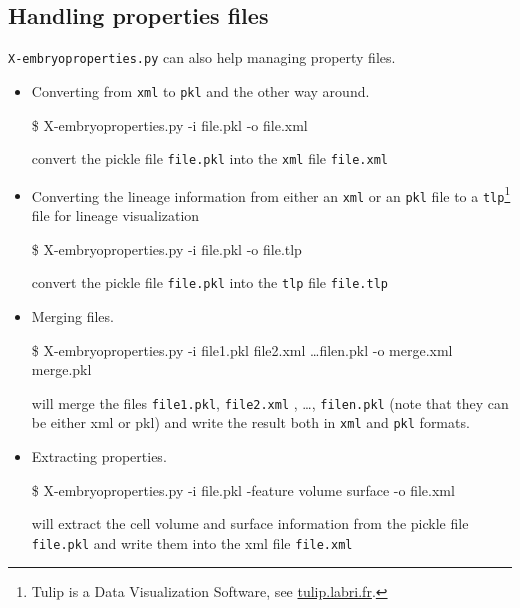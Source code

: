\subsection{Handling properties files}

\texttt{X-embryoproperties.py} can also help managing property files.

\begin{itemize}
  \itemsep -0.5ex
\item Converting from \texttt{xml} to \texttt{pkl} and  the other way around.
  \begin{code}{0.8}
  \$ X-embryoproperties.py -i file.pkl -o file.xml
  \end{code}
  convert the pickle file \texttt{file.pkl} into the \texttt{xml} file  \texttt{file.xml}
\item Converting the lineage information from either an \texttt{xml}
  or an \texttt{pkl} file to a \texttt{tlp}\footnote{Tulip is a Data
    Visualization Software, see \url{tulip.labri.fr}.} file for lineage visualization
  \begin{code}{0.8}
  \$ X-embryoproperties.py -i file.pkl -o file.tlp
  \end{code}
  convert the pickle file \texttt{file.pkl} into the \texttt{tlp} file  \texttt{file.tlp}
\item Merging files.
  \begin{code}{0.8}
  \$ X-embryoproperties.py -i file1.pkl file2.xml \ldots filen.pkl -o merge.xml merge.pkl
  \end{code}
  will merge the files  \texttt{file1.pkl},  \texttt{file2.xml} , \ldots, \texttt{filen.pkl} (note that they can be either xml or pkl) and write the result both in \texttt{xml} and \texttt{pkl} formats.
\item Extracting properties.
  \begin{code}{0.8}
  \$ X-embryoproperties.py -i file.pkl -feature volume surface -o file.xml
  \end{code}
  will extract the cell volume and surface information from the  pickle file \texttt{file.pkl} and write them into the xml file  \texttt{file.xml}
\end{itemize}
